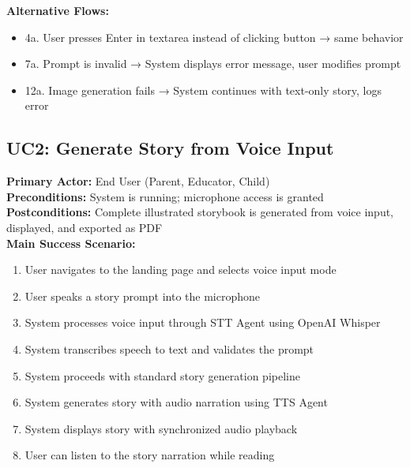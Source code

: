 \textbf{Alternative Flows:}
\begin{itemize}
    \item 4a. User presses Enter in textarea instead of clicking button → same behavior
    \item 7a. Prompt is invalid → System displays error message, user modifies prompt
    \item 12a. Image generation fails → System continues with text-only story, logs error
\end{itemize}

\subsection{UC2: Generate Story from Voice Input}
\textbf{Primary Actor:} End User (Parent, Educator, Child)\\
\textbf{Preconditions:} System is running; microphone access is granted\\
\textbf{Postconditions:} Complete illustrated storybook is generated from voice input, displayed, and exported as PDF\\
\textbf{Main Success Scenario:}
\begin{enumerate}
    \item User navigates to the landing page and selects voice input mode
    \item User speaks a story prompt into the microphone
    \item System processes voice input through STT Agent using OpenAI Whisper
    \item System transcribes speech to text and validates the prompt
    \item System proceeds with standard story generation pipeline
    \item System generates story with audio narration using TTS Agent
    \item System displays story with synchronized audio playback
    \item User can listen to the story narration while reading
\end{enumerate}

